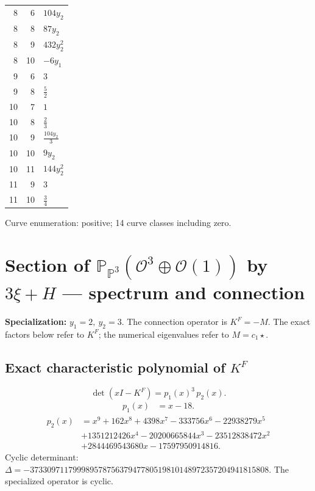 \documentclass[10pt,a4paper]{article}
\begin{document}
{\begin{longtable}{rrp{125mm}}
8 & 6 & $104 y_{2}$\\
8 & 8 & $87 y_{2}$\\
8 & 9 & $432 y_{2}^{2}$\\
8 & 10 & $- 6 y_{1}$\\
9 & 6 & $3$\\
9 & 8 & $\frac{5}{2}$\\
10 & 7 & $1$\\
10 & 8 & $\frac{2}{3}$\\
10 & 9 & $\frac{104 y_{2}}{3}$\\
10 & 10 & $9 y_{2}$\\
10 & 11 & $144 y_{2}^{2}$\\
11 & 9 & $3$\\
11 & 10 & $\frac{3}{4}$\\
\end{longtable}}
Curve enumeration: positive; 14 curve classes including zero.
\clearpage\section*{Section of $\mathbb P_{\mathbb P^{3}}(\mathcal O^{3}\oplus \mathcal O(1))$ by $3\xi +H$ --- spectrum and connection}
\textbf{Specialization:} $y_1=2,\ y_2=3$. The connection operator is $K^F=-M$. The exact factors below refer to $K^F$; the numerical eigenvalues refer to $M=c_1\star$.
\subsection*{Exact characteristic polynomial of $K^F$}
\[\det(xI-K^F)=p_{1}(x)^{3}\,p_{2}(x).\]
\[\begin{aligned}p_{1}(x)&=x - 18.\end{aligned}\]
\[\begin{aligned}p_{2}(x)&=x^{9} + 162 x^{8} + 4398 x^{7} - 333756 x^{6} - 22938279 x^{5}\\&+1351212426 x^{4} - 20200665844 x^{3} - 23512838472 x^{2}\\&+2844469543680 x - 17597950914816.\end{aligned}\]
Cyclic determinant: $\Delta=-37330971179998957875637947780519810148972357204941815808$. The specialized operator is cyclic.
\end{document}
